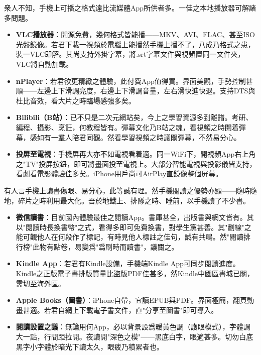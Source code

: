 
衆人不知，手機上可播之格式遠比流媒體App所供者多。一佳之本地播放器可解諸多問題。

\begin{itemize}
  \item \textbf{VLC播放器}：開源免費，幾何格式皆能播——MKV、AVI、FLAC、甚至ISO光盤鏡像。若君下載一視頻於電腦上能播然手機上播不了，八成乃格式之患，裝一VLC即解。其尚支持外掛字幕，將.srt字幕文件與視頻置同一文件夾，VLC將自動加載。
  \item \textbf{nPlayer}：若君欲更精緻之體驗，此付費App值得買。界面美觀，手勢控制甚順——左邊上下滑調亮度，右邊上下滑調音量，左右滑快進快退。支持DTS與杜比音效，看大片之時臨場感強多矣。
  \item \textbf{Bilibili（B站）}：已不只是二次元網站矣，今上之學習資源多到離譜。考研、編程、攝影、烹飪，何教程皆有。彈幕文化乃B站之魂，看視頻之時開着彈幕，感如有一羣人陪君同觀。然看學習視頻之時議關彈幕，不然易分心。
  \item \textbf{投屏至電視}：手機屏再大亦不如電視看着適。同一WiFi下，開視頻App右上角之"TV"投屏按鈕，即可將畫面投至電視上。大部分智能電視與投影儀皆支持，看劇看電影體驗佳多矣。iPhone用戶尚可AirPlay直鏡像整個屏幕。
\end{itemize}


有人言手機上讀書傷眼、易分心，此等誠有理。然手機閱讀之優勢亦顯——隨時隨地，碎片之時利用最大化。吾於地鐵上、排隊之時、睡前，以手機讀了不少書。

\begin{itemize}
  \item \textbf{微信讀書}：目前國內體驗最佳之閱讀App。書庫甚全，出版書與網文皆有。其以"閱讀時長換書幣"之式，看得多即可免費換書，對學生黨甚善。其"劃線"之能可觀他人在何段作了標記，有時見他人標註之佳句，誠有共鳴。然"閱讀排行榜"此物有點卷，易變爲"爲刷時而讀書"，議關之。
  \item \textbf{Kindle App}：若君有Kindle設備，手機端Kindle App可同步閱讀進度。Kindle之正版電子書排版質量比盜版PDF佳甚多，然Kindle中國區書城已關，需切至海外區。
  \item \textbf{Apple Books（圖書）}：iPhone自帶，宜讀EPUB與PDF。界面極簡，翻頁動畫甚適。若君自網上下載電子書文件，直"分享至圖書"即可導入。
  \item \textbf{閱讀設置之議}：無論用何App，必以背景設爲暖黃色調（護眼模式），字體調大一點，行間距拉開。夜讀開"深色之模"——黑底白字，眼適甚多。切勿白底黑字小字體於暗光下讀太久，眼疲乃積累者也。
\end{itemize}

